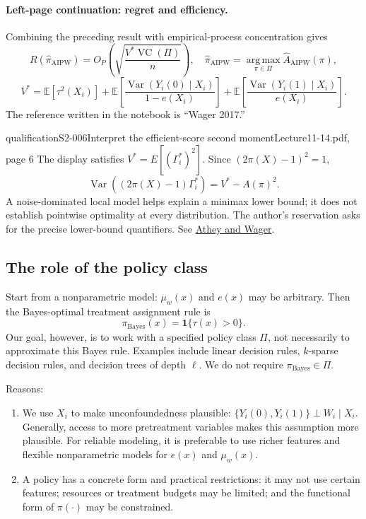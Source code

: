 \paragraph{Left-page continuation: regret and efficiency.}
Combining the preceding result with empirical-process concentration gives
\[
 R(\widehat\pi_{\mathrm{AIPW}})
 =O_P\left(\sqrt{\frac{V^*\operatorname{VC}(\Pi)}n}\right),
 \quad
 \widehat\pi_{\mathrm{AIPW}}
 =\operatorname*{arg\,max}_{\pi\in\Pi}\widehat A_{\mathrm{AIPW}}(\pi),
\]
\[
 V^*=\mathbb E[\tau^2(X_i)]
 +\mathbb E\left[\frac{\operatorname{Var}(Y_i(0)\mid X_i)}{1-e(X_i)}\right]
 +\mathbb E\left[\frac{\operatorname{Var}(Y_i(1)\mid X_i)}{e(X_i)}\right].
\]
The reference written in the notebook is ``Wager 2017.''  
\begin{reviewnote}{qualification}{S2-006}{Interpret the efficient-score second moment}{Lecture11-14.pdf, page 6}
The display satisfies $V^*=E[(\Gamma_i^*)^2]$. Since $(2\pi(X)-1)^2=1$,
\[
 \operatorname{Var}((2\pi(X)-1)\Gamma_i^*)=V^*-A(\pi)^2.
\]
A noise-dominated local model helps explain a minimax lower bound; it does not establish pointwise optimality at every distribution. The author's reservation asks for the precise lower-bound quantifiers. See \href{https://arxiv.org/abs/1702.02896}{Athey and Wager}.
\end{reviewnote}


\subsection{The role of the policy class}
Start from a nonparametric model: $\mu_w(x)$ and $e(x)$ may be arbitrary. Then the Bayes-optimal treatment assignment rule is
\[
 \pi_{\mathrm{Bayes}}(x)=\mathbf1\{\tau(x)>0\}.
\]
Our goal, however, is to work with a specified policy class $\Pi$, not necessarily to approximate this Bayes rule. Examples include linear decision rules, $k$-sparse decision rules, and decision trees of depth $\ell$. We do not require $\pi_{\mathrm{Bayes}}\in\Pi$.

Reasons:
\begin{enumerate}
 \item We use $X_i$ to make unconfoundedness plausible:
 $\{Y_i(0),Y_i(1)\}\perp W_i\mid X_i$. Generally, access to more pretreatment variables makes this assumption more plausible. For reliable modeling, it is preferable to use richer features and flexible nonparametric models for $e(x)$ and $\mu_w(x)$.
 \item A policy has a concrete form and practical restrictions: it may not use certain features; resources or treatment budgets may be limited; and the functional form of $\pi(\cdot)$ may be constrained.
\end{enumerate}

